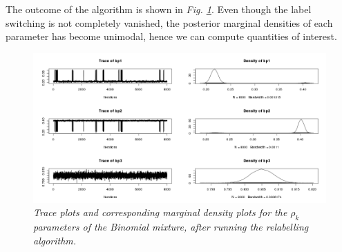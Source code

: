 The outcome of the algorithm is shown in \emph{Fig. \ref{labelBP-stephens-pic}}. Even though the label switching is not completely vanished, the posterior marginal densities of each parameter has become unimodal, hence we can compute quantities of interest.
\begin{figure}[!ht]
\begin{center}
 \includegraphics[scale = 0.39]{images/labelBP-stephens.png}
\caption{\emph{Trace plots and corresponding marginal density plots for the $\rho_{k}$ parameters of the Binomial mixture, after running the \citet{Stephens2000} relabelling algorithm.}}
\label{labelBP-stephens-pic}
\end{center}
\end{figure}
